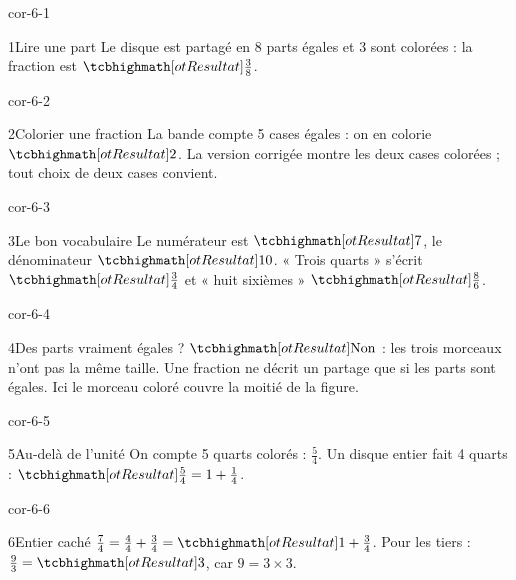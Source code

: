 \clearpage\pagestyle{otMain}\setlength{\otBlocEspacement}{2.5mm}\fontsize{11}{15}\selectfont{}
\begin{blocLivre}{cor-6-1}\begin{corrige}{1}{Lire une part}
Le disque est partagé en 8 parts égales et 3 sont colorées : la fraction est $\res{\frac38}$.
\label{fig-cor-6-1}
\end{corrige}\end{blocLivre}
\begin{blocLivre}{cor-6-2}\begin{corrige}{2}{Colorier une fraction}
La bande compte 5 cases égales : on en colorie $\res2$. La version corrigée montre les deux cases colorées ; tout choix de deux cases convient.
\label{fig-cor-6-2}
\end{corrige}\end{blocLivre}
\begin{blocLivre}{cor-6-3}\begin{corrige}{3}{Le bon vocabulaire}
Le numérateur est $\res7$, le dénominateur $\res{10}$. « Trois quarts » s’écrit $\res{\frac34}$ et « huit sixièmes » $\res{\frac86}$.
\end{corrige}\end{blocLivre}
\begin{blocLivre}{cor-6-4}\begin{corrige}{4}{Des parts vraiment égales ?}
$\res{\text{Non}}$ : les trois morceaux n’ont pas la même taille. Une fraction ne décrit un partage que si les parts sont égales. Ici le morceau coloré couvre la moitié de la figure.
\label{fig-cor-6-4}
\end{corrige}\end{blocLivre}
\begin{blocLivre}{cor-6-5}\begin{corrige}{5}{Au-delà de l’unité}
On compte 5 quarts colorés : $\frac54$. Un disque entier fait 4 quarts : $\res{\frac54=1+\frac14}$.
\label{fig-cor-6-5}
\end{corrige}\end{blocLivre}
\begin{blocLivre}{cor-6-6}\begin{corrige}{6}{Entier caché}
$\frac74=\frac44+\frac34=\res{1+\frac34}$. Pour les tiers : $\frac93=\res3$, car $9=3\times3$.
\end{corrige}\end{blocLivre}
